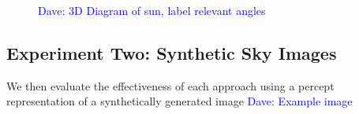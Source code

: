 \documentclass[11pt]{article}
\newcommand{\dnote}[1]{\textcolor{blue}{Dave: #1}}
\begin{document}
\begin{figure}
\begin{center}
\hspace{5mm}
\caption{\dnote{3D Diagram of sun, label relevant angles}}
\end{center}
\end{figure}

\subsection{Experiment Two: Synthetic Sky Images}

We then evaluate the effectiveness of each approach using a percept representation of a synthetically generated image
\dnote{Example image}
\end{document}
